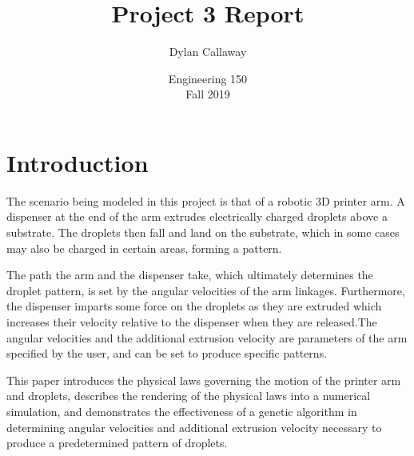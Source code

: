 \documentclass[a4paper,12pt]{report}
\begin{document}
\setlength{\abovedisplayskip}{6pt}
\setlength{\belowdisplayskip}{8pt}
\setlength{\abovedisplayshortskip}{2pt}
\setlength{\belowdisplayshortskip}{8pt}

\title{Project 3 Report}
\author{Dylan Callaway}
\date{Engineering 150 \\ Fall 2019}
\maketitle

\tableofcontents
\newpage
{}

\newenvironment{nscenter}
 {\setlength{\topsep}{0ex}\trivlist\item\relax\centering}
 {\endtrivlist}

\section{Introduction}
The scenario being modeled in this project is that of a robotic 3D printer arm. A dispenser at the end of the arm extrudes electrically charged droplets above a substrate. The droplets then fall and land on the substrate, which in some cases may also be charged in certain areas, forming a pattern.

The path the arm and the dispenser take, which ultimately determines the droplet pattern, is set by the angular velocities of the arm linkages. Furthermore, the dispenser imparts some force on the droplets as they are extruded which increases their velocity relative to the dispenser when they are released.The angular velocities and the additional extrusion velocity are parameters of the arm specified by the user, and can be set to produce specific patterns.

This paper introduces the physical laws governing the motion of the printer arm and droplets, describes the rendering of the physical laws into a numerical simulation, and demonstrates the effectiveness of a genetic algorithm in determining angular velocities and additional extrusion velocity necessary to produce a predetermined pattern of droplets.
\end{document}
